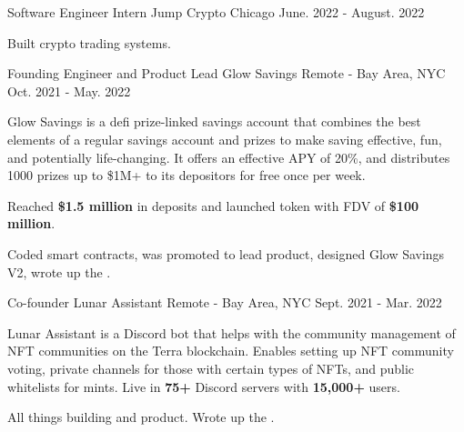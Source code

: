 

\begin{cventries}

  \cventry
  {Software Engineer Intern}
  {Jump Crypto}
  {Chicago}
  {June. 2022 - August. 2022}
  {
    \begin{cvitems}
    \item{Built crypto trading systems.}
    \end{cvitems}
  }

  \cventry
  {Founding Engineer and Product Lead}
  {Glow Savings}
  {Remote - Bay Area, NYC}
  {Oct. 2021 - May. 2022}
  {
    \begin{cvitems}
    \item{Glow Savings is a defi prize-linked savings account that combines the best elements of a regular savings account and prizes to make saving effective, fun, and potentially life-changing.  It offers an effective APY of 20\%, and distributes 1000 prizes up to \$1M+ to its depositors for free once per week.}
    \item{Reached \textbf{\$1.5 million} in deposits and launched token with FDV of \textbf{\$100 million}.}
    \item{Coded smart contracts, was promoted to lead product, designed Glow Savings V2, wrote up the .}
    \end{cvitems}
  }

  \cventry
  {Co-founder}
  {Lunar Assistant}
  {Remote - Bay Area, NYC}
  {Sept. 2021 - Mar. 2022}
  {
    \begin{cvitems}
    \item{Lunar Assistant is a Discord bot that helps with the community management of NFT communities on the Terra blockchain. Enables setting up NFT community voting, private channels for those with certain types of NFTs, and public whitelists for mints. Live in \textbf{75+} Discord servers with \textbf{15,000+} users.}
    \item{All things building and product. Wrote up the .}
    \end{cvitems}
  }


\end{cventries}
